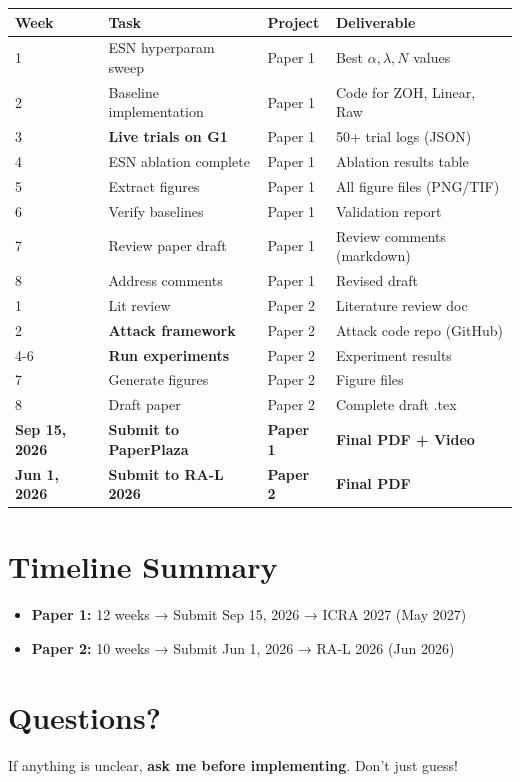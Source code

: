 \documentclass[11pt]{article}
\begin{document}
\begin{tabular}{|l|l|l|l|}
\hline
\textbf{Week} & \textbf{Task} & \textbf{Project} & \textbf{Deliverable} \\
\hline
1 & ESN hyperparam sweep & Paper 1 & Best $\alpha, \lambda, N$ values \\
\hline
2 & Baseline implementation & Paper 1 & Code for ZOH, Linear, Raw \\
\hline
3 & \textbf{Live trials on G1} & Paper 1 & 50+ trial logs (JSON) \\
\hline
4 & ESN ablation complete & Paper 1 & Ablation results table \\
\hline
5 & Extract figures & Paper 1 & All figure files (PNG/TIF) \\
\hline
6 & Verify baselines & Paper 1 & Validation report \\
\hline
7 & Review paper draft & Paper 1 & Review comments (markdown) \\
\hline
8 & Address comments & Paper 1 & Revised draft \\
\hline
1 & Lit review & Paper 2 & Literature review doc \\
\hline
2 & \textbf{Attack framework} & Paper 2 & Attack code repo (GitHub) \\
\hline
4-6 & \textbf{Run experiments} & Paper 2 & Experiment results \\
\hline
7 & Generate figures & Paper 2 & Figure files \\
\hline
8 & Draft paper & Paper 2 & Complete draft .tex \\
\hline
\hline
\textbf{Sep 15, 2026} & \textbf{Submit to PaperPlaza} & \textbf{Paper 1} & \textbf{Final PDF + Video} \\
\hline
\textbf{Jun 1, 2026} & \textbf{Submit to RA-L 2026} & \textbf{Paper 2} & \textbf{Final PDF} \\
\hline
\end{tabular}

\section{Timeline Summary}
\begin{itemize}
    \item \textbf{Paper 1:} 12 weeks → Submit Sep 15, 2026 → ICRA 2027 (May 2027)
    \item \textbf{Paper 2:} 10 weeks → Submit Jun 1, 2026 → RA-L 2026 (Jun 2026)
\end{itemize}

\section{Questions?}
If anything is unclear, \textbf{ask me before implementing}. Don't just guess!
\end{document}
